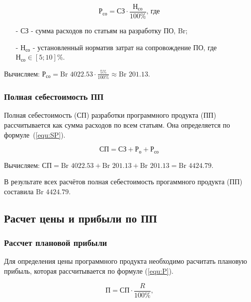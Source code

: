 \begin{equation}
    \label{equ:Pco}
    \text{Р}_\text{со} = \text{СЗ} \cdot \frac{ \text{Н}_\text{со} }{ 100\% } \text{, где}
\end{equation}

\begin{enumerate}
    \item[-] $\text{СЗ}$ - сумма расходов по статьям на разработку ПО, Br; 
    \item[-] $\text{Н}_\text{со}$ - установленный норматив затрат на сопровождение ПО, где $\text{Н}_\text{со} \in [5;10]\%$.
\end{enumerate}

Вычисляем: $\text{Р}_\text{со} = \text{Br } 4022.53 \cdot \frac{ 5\% }{ 100\% } \approx \text{Br } 201.13$.

\subsubsection*{Полная себестоимость ПП}

Полная себестоимость ($\text{СП}$) разработки программного продукта (ПП)
рассчитывается как сумма расходов по всем статьям.
Она определяется по формуле~(\ref{equ:SP}). 

\begin{equation}
    \label{equ:SP}
    \text{СП} = \text{СЗ} + \text{Р}_\text{о} + \text{Р}_\text{со}
\end{equation}

Вычисляем: $\text{СП} = \text{Br } 4022.53 + \text{Br } 201.13 + \text{Br } 201.13 = \text{Br } 4424.79$.

В результате всех расчётов полная себестоимость прогаммного продукта (ПП) составила $\text{Br } 4424.79$.

\subsection{Расчет цены и прибыли по ПП}

\subsubsection*{Рассчет плановой прибыли}

Для определения цены программного продукта необходимо расчитать плановую прибыль,
которая рассчитывается по формуле (\ref{equ:P}).

\begin{equation}
    \label{equ:P}
    \text{П} = \text{СП} \cdot \frac{ R }{ 100\% } \text{,}
\end{equation}

